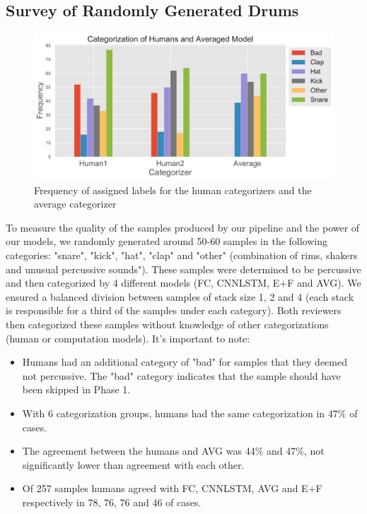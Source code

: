 \documentclass{nime-alternate} %
\begin{document}
 \subsection{Survey of Randomly Generated Drums}
\label{survey}
\begin{figure}[H]
\centering
\includegraphics[width=1.1\linewidth]{images/cat.pdf}
\caption{Frequency of assigned labels for the human categorizers and the average categorizer}
\label{fig:freq-survey}
\end{figure}
To measure the quality of the samples produced by our pipeline and the power of our models, we randomly generated around 50-60 samples in the following categories: "snare", "kick", "hat", "clap" and "other" (combination of rims, 
shakers and unusual percussive sounds"). These samples were determined to be percussive and then categorized by 4 different models (FC, CNNLSTM, E+F and AVG). We ensured a balanced division between samples of stack size 1, 2 and 4 (each stack is responsible for a third of the samples under each category). Both reviewers then categorized these samples without knowledge of other categorizations (human or computation models). It's important to note:
\begin{itemize}
    \item Humans had an additional category of "bad" for samples that they deemed not percussive. The "bad" category indicates that the sample should have been skipped in Phase 1. 
    \item With 6 categorization groups, humans had the same categorization in 47\% of cases.
    \item The agreement between the humans and AVG was 44\% and 47\%, not significantly lower than agreement with each other. 
    \item Of 257 samples humans agreed with FC, CNNLSTM, AVG and E+F respectively in 78, 76, 76 and 46 of cases.
\end{itemize}
\end{document}

